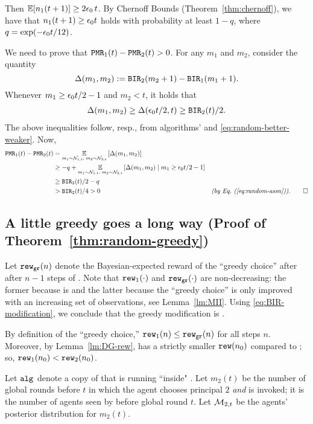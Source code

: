 Then
    $\E[n_1(t+1)] \geq 2\eps_0\,t $.
By Chernoff Bounds (Theorem~\ref{thm:chernoff}), we have that
    $n_1(t+1)\geq \epsilon_0 t$
holds with probability at least $1-q$,
where $q = \exp(-\epsilon_0 t/12)$.

We need to prove that
    $\mathtt{PMR}_1(t) - \mathtt{PMR}_2(t)>0$.
For any $m_1$ and $m_2$, consider the quantity
\[ \Delta(m_1,m_2) := \mathtt{BIR}_2(m_2+1) - \mathtt{BIR}_1(m_1+1).\]
Whenever $m_1 \geq \epsilon_0 t/2 -1$ and $m_2<t$, it holds that
\begin{align*}
\Delta(m_1,m_2) \geq \Delta(\epsilon_0 t / 2, t)
    \geq \mathtt{BIR}_2(t)/2.
\end{align*}
The above inequalities follow, resp., from algorithms' \bmonotonicity and \eqref{eq:random-better-weaker}. Now,
\begin{align*}
\PMR_1(t) - \PMR_2(t)
    &= \Ex{m_1\sim \posteriorN{1}{t},\;m_2\sim \posteriorN{2}{t}}{\Delta(m_1,m_2)} \\
    &\geq -q
        + \Ex{m_1\sim \posteriorN{1}{t},\;m_2\sim \posteriorN{2}{t}}
            {\Delta(m_1,m_2)\mid m_1 \geq \eps_0 t/2-1} \\
    &\geq \BIR_2(t)/2-q \\
    &> \BIR_2(t)/4 > 0
    &\EqComment{by \refeq{eq:random-assn}}. \qedhere
\end{align*}

\subsection{A little greedy goes a long way
(Proof of Theorem~\ref{thm:random-greedy})}
\label{sec:proofs-HMR-main}


  Let $\mathtt{rew}_{\texttt{gr}}(n)$ denote the Bayesian-expected reward of the ``greedy
  choice'' after after $n-1$ steps of \alg[1]. Note that
  $\mathtt{rew}_1(\cdot)$ and $\mathtt{rew}_{\texttt{gr}}(\cdot)$ are non-decreasing: the former
  because \alg[1] is \bmonotone and the latter because the ``greedy
  choice'' is only improved with an increasing set of
  observations, see Lemma~\ref{lm:MII}.
Using \eqref{eq:BIR-modification}, we conclude that
the greedy modification \alg[2] is \bmonotone.

  By definition of the ``greedy choice,'' $\mathtt{rew}_1(n)\leq \mathtt{rew}_{\texttt{gr}}(n)$
  for all steps $n$. Moreover, by Lemma~\ref{lm:DG-rew},
  \alg[1] has a strictly smaller $\mathtt{rew}(n_0)$ compared to \DynGreedy;
  so, $\mathtt{rew}_1(n_0)<\mathtt{rew}_2(n_0)$.

Let $\mathtt{alg}_{}$ denote a copy of \alg[1] that is running ``inside" \alg[2]. Let $m_2(t)$ be the number of global rounds before $t$ in which the agent chooses principal $2$ \emph{and} \alg is invoked; \ie it is the number of agents seen by \alg before global round $t$. Let $\mathcal{M}_{2,t}$ be the agents' posterior distribution for $m_2(t)$.

